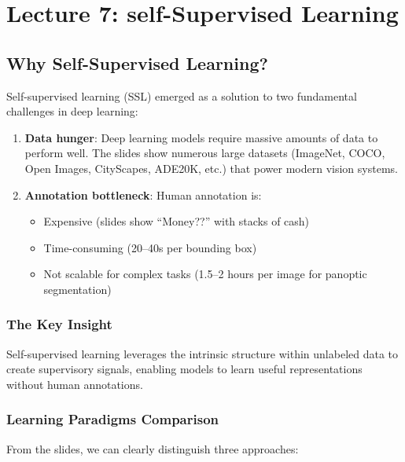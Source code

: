 \chapter{\normalsize Lecture 7: self-Supervised Learning}
\section{Why Self-Supervised Learning?}

Self-supervised learning (SSL) emerged as a solution to two fundamental challenges in deep learning:

\begin{enumerate}
    \item \textbf{Data hunger}: Deep learning models require massive amounts of data to perform well. The slides show numerous large datasets (ImageNet, COCO, Open Images, CityScapes, ADE20K, etc.) that power modern vision systems.
    \item \textbf{Annotation bottleneck}: Human annotation is:
    \begin{itemize}
        \item Expensive (slides show ``Money??'' with stacks of cash)
        \item Time-consuming (20--40s per bounding box)
        \item Not scalable for complex tasks (1.5--2 hours per image for panoptic segmentation)
    \end{itemize}
\end{enumerate}

\subsection*{The Key Insight}
Self-supervised learning leverages the intrinsic structure within unlabeled data to create supervisory signals, enabling models to learn useful representations without human annotations.

\subsection*{Learning Paradigms Comparison}
From the slides, we can clearly distinguish three approaches:

